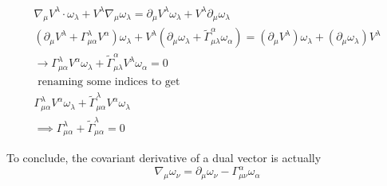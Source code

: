 \begin{gather*}
\nabla _{\mu }V^{\lambda }\cdot \omega _{\lambda } + V^{\lambda }\nabla _{\mu }\omega _{\lambda } = \partial_{\mu }V^{\lambda }\omega _{\lambda } + V^{\lambda }\partial_{\mu }\omega _{\lambda } \\
\left( \partial_{\mu }V^{\lambda } + \Gamma ^{\lambda }_{\mu  \alpha }V^{\alpha } \right)\omega _{\lambda } + V^{\lambda }\left( \partial_{\mu }\omega _{\lambda } + \tilde{\Gamma }^{\alpha }_{\mu  \lambda } \omega _{\alpha } \right) = \left( \partial_{\mu }V^{\lambda } \right)\omega _{\lambda }+ \left( \partial_{\mu }\omega _{\lambda } \right)V^{\lambda }\\
\to  \Gamma ^{\lambda }_{\mu  \alpha }V^{\alpha }\omega _{\lambda } + \tilde{\Gamma }^{\alpha }_{\mu \lambda } V^{\lambda }\omega _{\alpha } = 0 \\
\text{ renaming some indices to get }\\
\Gamma ^{\lambda }_{\mu \alpha }V^{\alpha }\omega _{\lambda } + \tilde{\Gamma }^{\lambda }_{\mu  \alpha } V^{\alpha }\omega _{\lambda } \\
\implies \Gamma ^{\lambda }_{\mu \alpha } + \tilde{\Gamma }^{\lambda }_{\mu  \alpha } = 0
\end{gather*}

To conclude, the covariant derivative of a dual vector is actually
\begin{equation}
\nabla _{\mu }\omega_{\nu  }= \partial_{\mu }\omega _{\nu } - \Gamma ^{\alpha }_{\mu \nu }\omega _{\alpha }
\end{equation}
 























